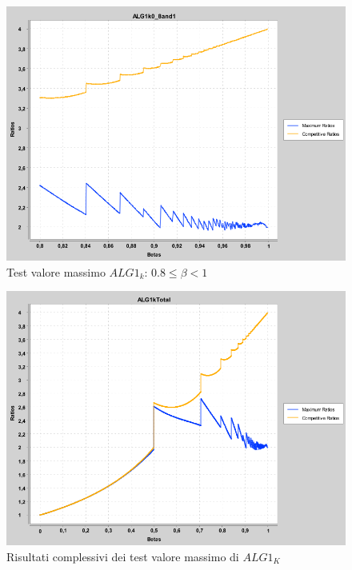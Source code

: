 \documentclass[12pt]{article}
\begin{document}
\begin{figure}[H]
\caption{Test valore massimo $ALG1_{k}$: $0.8 \leq \beta < 1$}
\centering
\includegraphics[scale=0.4]{max/ALG1k0_8and1.png}
\end{figure}
\begin{figure}[H]
\caption{Risultati complessivi dei test valore massimo di $ALG1_{K}$}
\centering
\includegraphics[scale=0.4]{max/ALG1kTotal.png}
\end{figure}
\end{document}
